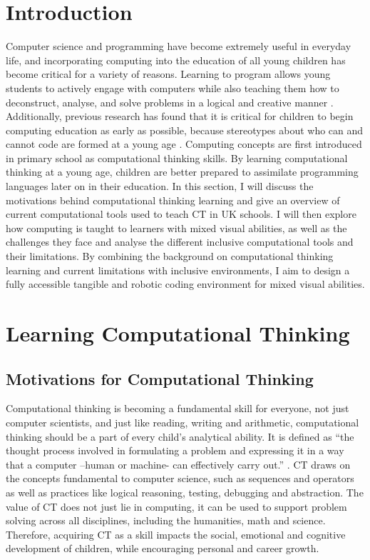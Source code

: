 \documentclass[oneside,%
                    author={Malak Hajji},
                    degree={BSc},
                    title={Designing An Accessible Computational Toolkit For Students},
                  subtitle={With Mixed Visual Abilities}]{dissertation}
\begin{document}
\section{Introduction}

Computer science and programming have become extremely useful in everyday life, and incorporating computing into the education of all young children has become critical for a variety of reasons. Learning to program allows young students to actively engage with computers while also teaching them how to deconstruct, analyse, and solve problems in a logical and creative manner \cite{CB-intro1}.
Additionally, previous research has found that it is critical for children to begin computing education as early as possible, because stereotypes about who can and cannot code are formed at a young age \cite{CB-intro2, CB-intro3}.
Computing concepts are first introduced in primary school as computational thinking skills. By learning computational thinking at a young age, children are better prepared to assimilate programming languages later on in their education. 
In this section, I will discuss the motivations behind computational thinking learning and give an overview of current computational tools used to teach CT in UK schools. I will then explore how computing is taught to learners with mixed visual abilities, as well as the challenges they face and analyse the different inclusive computational tools and their limitations. By combining the background on computational thinking learning and current limitations with  inclusive environments, I aim to design a fully accessible tangible  and robotic coding environment for mixed visual abilities.

\section{Learning Computational Thinking}  
\subsection{Motivations for Computational Thinking}
Computational thinking is becoming a fundamental skill for everyone, not just computer scientists, and just like reading, writing and arithmetic, computational thinking should be a part of every child’s analytical ability. It is defined as “the thought process involved in formulating a problem and expressing it in a way that a computer –human or machine- can effectively carry out.” \cite{CB-CT1}. CT draws on the concepts fundamental to computer science, such as sequences and operators as well as practices like logical reasoning, testing, debugging and abstraction. The value of CT does not just lie in computing, it can be used to support problem solving across all disciplines, including the humanities, math and science. Therefore, acquiring CT as a skill impacts the social, emotional and cognitive development of children, while encouraging personal and career growth.
\end{document}
